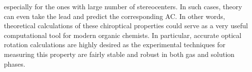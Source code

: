 especially for the ones with large number of stereocenters. In such cases, theory can even take the 
lead and predict the corresponding AC. In other words, theoretical calculations of these chiroptical 
properties could serve as a very useful computational tool for modern organic chemists. In particular, 
accurate optical rotation calculations are highly desired as the experimental techniques for measuring 
this property are fairly stable and robust in both gas and solution phases.
\\
